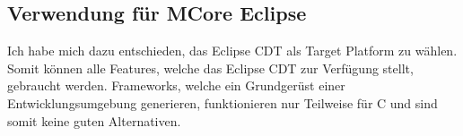 \subsection{Verwendung für MCore Eclipse}
Ich habe mich dazu entschieden, das Eclipse CDT als Target Platform zu wählen. Somit können alle Features, welche das Eclipse CDT zur Verfügung stellt, gebraucht werden. Frameworks, welche ein Grundgerüst einer Entwicklungsumgebung generieren, funktionieren nur Teilweise für C und sind somit keine guten Alternativen.

